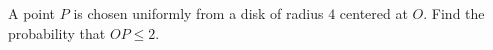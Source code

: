 A point $P$ is chosen uniformly from a disk of radius $4$ centered at $O$. Find the probability that $OP\le2$.
